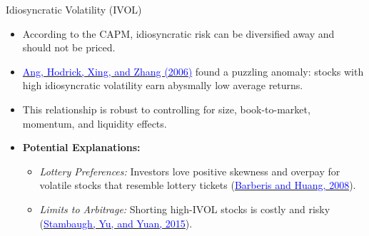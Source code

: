 \documentclass{beamer}
\begin{document}
\begin{frame}{Idiosyncratic Volatility (IVOL)}
	\begin{itemize}
		\item According to the CAPM, idiosyncratic risk can be diversified away and should not be priced.
		\item \href{https://doi.org/10.1111/j.1540-6261.2006.00836.x}{\textcolor{blue}{Ang, Hodrick, Xing, and Zhang (2006)}} found a puzzling anomaly: stocks with high idiosyncratic volatility earn abysmally low average returns.
		\item This relationship is robust to controlling for size, book-to-market, momentum, and liquidity effects.
		\item \textbf{Potential Explanations:}
		\begin{itemize}
			\item \textit{Lottery Preferences:} Investors love positive skewness and overpay for volatile stocks that resemble lottery tickets (\href{https://doi.org/10.1257/aer.98.5.2066}{\textcolor{blue}{Barberis and Huang, 2008}}).
			\item \textit{Limits to Arbitrage:} Shorting high-IVOL stocks is costly and risky (\href{https://doi.org/10.1111/jofi.12286}{\textcolor{blue}{Stambaugh, Yu, and Yuan, 2015}}).
		\end{itemize}
	\end{itemize}
\end{frame}
\end{document}
